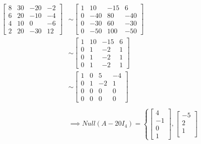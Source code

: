 \documentclass[11pt, a4paper, norsk]{NTNUoving}
\begin{document}
\begin{oppgave}
\begin{punkt}
            \begin{align*}
                \begin{bmatrix}
                    8 & 30 & -20 & -2 \\
                    6 & 20 & -10 & -4 \\
                    4 & 10 & 0 & -6 \\
                    2 & 20 & -30 & 12
                \end{bmatrix} &\sim \begin{bmatrix}
                1 & 10 & -15 & 6 \\
                0 & -40 & 80 & -40 \\
                0 & -30 & 60 & -30 \\
                0 & -50 & 100 & -50
                \end{bmatrix}
                \\
                &\sim \begin{bmatrix}
                    1 & 10 & -15 & 6 \\
                    0 & 1 & -2 & 1 \\
                    0 & 1 & -2 & 1 \\
                    0 & 1 & -2 & 1
                \end{bmatrix}
                \\
                &\sim \begin{bmatrix}
                    1 & 0 & 5 & -4 \\
                    0 & 1 & -2 & 1 \\
                    0 & 0 & 0 & 0 \\
                    0 & 0 & 0 & 0
                \end{bmatrix}
                \\
                \\
                &\implies Null(A - 20I_4) = \left\{\begin{bmatrix}
                    4 \\
                    -1 \\
                    0 \\
                    1
                \end{bmatrix}, \begin{bmatrix}
                    -5 \\
                    2 \\
                    1 \\

\end{bmatrix}
\end{align*}
\end{punkt}
\end{oppgave}
\end{document}
